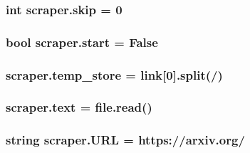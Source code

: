 \subsubsection[{\texorpdfstring{skip}{skip}}]{\setlength{\rightskip}{0pt plus 5cm}int scraper.\+skip = 0}\hypertarget{namespacescraper_a7716e2d7e7879e1cadb7839b0a1533c7}{}\label{namespacescraper_a7716e2d7e7879e1cadb7839b0a1533c7}
\subsubsection[{\texorpdfstring{start}{start}}]{\setlength{\rightskip}{0pt plus 5cm}bool scraper.\+start = False}\hypertarget{namespacescraper_a4aaf6d11bb8b81670a9f26121befb435}{}\label{namespacescraper_a4aaf6d11bb8b81670a9f26121befb435}
\subsubsection[{\texorpdfstring{temp\+\_\+store}{temp_store}}]{\setlength{\rightskip}{0pt plus 5cm}scraper.\+temp\+\_\+store = link\mbox{[}0\mbox{]}.split(\textquotesingle{}/\textquotesingle{})}\hypertarget{namespacescraper_a45d2ebfdc67be7ce1963c8176262be5d}{}\label{namespacescraper_a45d2ebfdc67be7ce1963c8176262be5d}
\subsubsection[{\texorpdfstring{text}{text}}]{\setlength{\rightskip}{0pt plus 5cm}scraper.\+text = file.\+read()}\hypertarget{namespacescraper_a1e2bdd0d9a1a63195db7a2da89193e40}{}\label{namespacescraper_a1e2bdd0d9a1a63195db7a2da89193e40}
\subsubsection[{\texorpdfstring{U\+RL}{URL}}]{\setlength{\rightskip}{0pt plus 5cm}string scraper.\+U\+RL = \textquotesingle{}https\+://arxiv.\+org/\textquotesingle{}}\hypertarget{namespacescraper_a60a59c7182708d1f2fdee75dd2a88e7d}{}\label{namespacescraper_a60a59c7182708d1f2fdee75dd2a88e7d}

